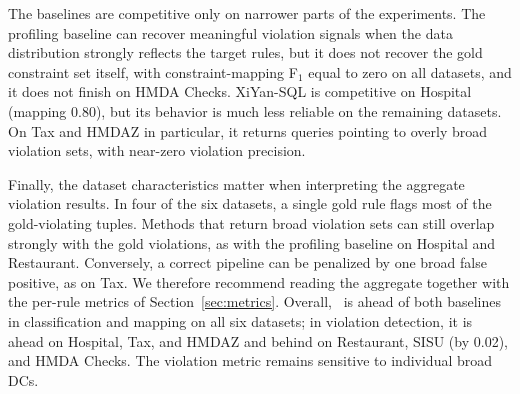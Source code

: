 The baselines are competitive only on narrower parts of the experiments. The profiling baseline can recover meaningful violation signals when the data distribution strongly reflects the target rules, but it does not recover the gold
constraint set itself, with constraint-mapping F$_1$ equal to zero on all datasets, and it does not finish on HMDA Checks. XiYan-SQL is competitive on Hospital (mapping 0.80), but its behavior is much less reliable on the remaining datasets. On Tax and HMDAZ in particular, it returns queries pointing to overly broad violation sets, with near-zero violation precision.

Finally, the dataset characteristics matter when interpreting the aggregate
violation results. In four of the six datasets, a single gold rule flags most of
the gold-violating tuples. Methods that return broad violation sets can still overlap strongly
with the gold violations, as with the profiling baseline on Hospital and
Restaurant. Conversely, a correct pipeline can be penalized by one broad false
positive, as on Tax. We therefore recommend reading the aggregate together with
the per-rule metrics of Section~\ref{sec:metrics}.
Overall, \system\ is ahead of both baselines in classification and mapping on all six datasets; in violation detection, it is ahead on Hospital, Tax, and HMDAZ and behind on Restaurant, SISU (by 0.02), and HMDA Checks. The violation metric remains sensitive to individual broad DCs.



